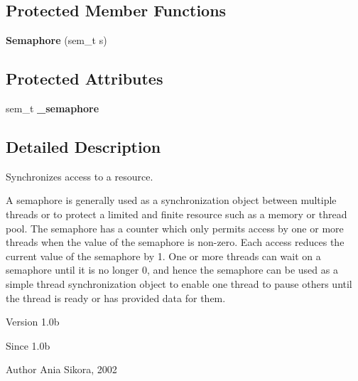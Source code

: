 \subsection*{Protected Member Functions}
\begin{DoxyCompactItemize}
\item 
\hypertarget{class_common_1_1_semaphore_a718f317dc5f0a37c0f164cbaf29982d4}{{\bfseries Semaphore} (sem\-\_\-t s)}\label{class_common_1_1_semaphore_a718f317dc5f0a37c0f164cbaf29982d4}

\end{DoxyCompactItemize}
\subsection*{Protected Attributes}
\begin{DoxyCompactItemize}
\item 
\hypertarget{class_common_1_1_semaphore_a34fd832be9882679d1f0e2bb256613b5}{sem\-\_\-t {\bfseries \-\_\-semaphore}}\label{class_common_1_1_semaphore_a34fd832be9882679d1f0e2bb256613b5}

\end{DoxyCompactItemize}


\subsection{Detailed Description}
Synchronizes access to a resource. 

A semaphore is generally used as a synchronization object between multiple threads or to protect a limited and finite resource such as a memory or thread pool. The semaphore has a counter which only permits access by one or more threads when the value of the semaphore is non-\/zero. Each access reduces the current value of the semaphore by 1. One or more threads can wait on a semaphore until it is no longer 0, and hence the semaphore can be used as a simple thread synchronization object to enable one thread to pause others until the thread is ready or has provided data for them.

\begin{DoxyVersion}{Version}
1.\-0b 
\end{DoxyVersion}
\begin{DoxySince}{Since}
1.\-0b 
\end{DoxySince}
\begin{DoxyAuthor}{Author}
Ania Sikora, 2002 
\end{DoxyAuthor}



